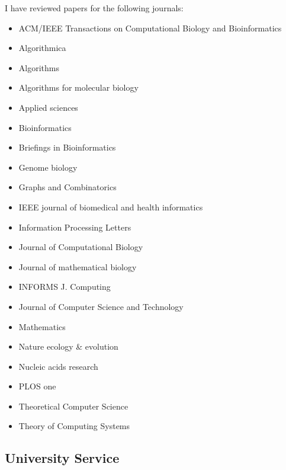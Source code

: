 \documentclass[11pt,a4paper,roman]{moderncv}
\begin{document}
I have reviewed papers for the following journals:
\begin{itemize}
\item ACM/IEEE Transactions on Computational Biology and Bioinformatics
\item Algorithmica
\item Algorithms
\item Algorithms for molecular biology
\item Applied sciences
\item Bioinformatics
\item Briefings in Bioinformatics
\item  Genome biology
\item Graphs and Combinatorics
\item IEEE journal of biomedical and health informatics
\item Information Processing Letters
\item Journal of Computational Biology
\item  Journal of mathematical biology
\item INFORMS J. Computing
\item Journal of Computer Science and Technology
\item Mathematics
\item Nature ecology \& evolution
\item Nucleic acids research
\item PLOS one
\item Theoretical Computer Science
\item Theory of Computing Systems
\end{itemize}


\subsection{University Service}




\end{document}
